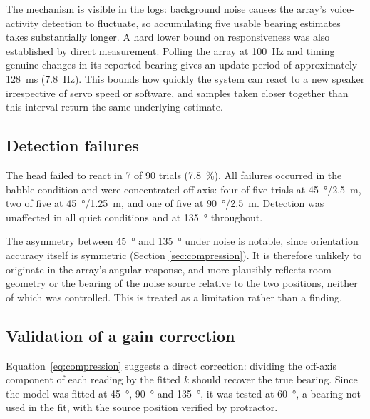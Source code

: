The mechanism is visible in the logs: background noise causes the array's
voice-activity detection to fluctuate, so accumulating five usable bearing
estimates takes substantially longer. A hard lower bound on responsiveness was
also established by direct measurement. Polling the array at \SI{100}{\hertz}
and timing genuine changes in its reported bearing gives an update period of
approximately \SI{128}{\milli\second} (\SI{7.8}{\hertz}). This bounds how
quickly the system can react to a new speaker irrespective of servo speed or
software, and samples taken closer together than this interval return the same
underlying estimate.

\subsection{Detection failures}

The head failed to react in 7 of 90 trials (\SI{7.8}{\percent}). All failures
occurred in the babble condition and were concentrated off-axis: four of five
trials at \SI{45}{\degree}/\SI{2.5}{\metre}, two of five at
\SI{45}{\degree}/\SI{1.25}{\metre}, and one of five at
\SI{90}{\degree}/\SI{2.5}{\metre}. Detection was unaffected in all quiet
conditions and at \SI{135}{\degree} throughout.

The asymmetry between \SI{45}{\degree} and \SI{135}{\degree} under noise is
notable, since orientation accuracy itself is symmetric (Section
\ref{sec:compression}). It is therefore unlikely to originate in the array's
angular response, and more plausibly reflects room geometry or the bearing of
the noise source relative to the two positions, neither of which was
controlled. This is treated as a limitation rather than a finding.

\subsection{Validation of a gain correction}
\label{sec:validation}

Equation~\ref{eq:compression} suggests a direct correction: dividing the
off-axis component of each reading by the fitted $k$ should recover the true
bearing. Since the model was fitted at \SI{45}{\degree}, \SI{90}{\degree} and
\SI{135}{\degree}, it was tested at \SI{60}{\degree}, a bearing not used in the
fit, with the source position verified by protractor.

